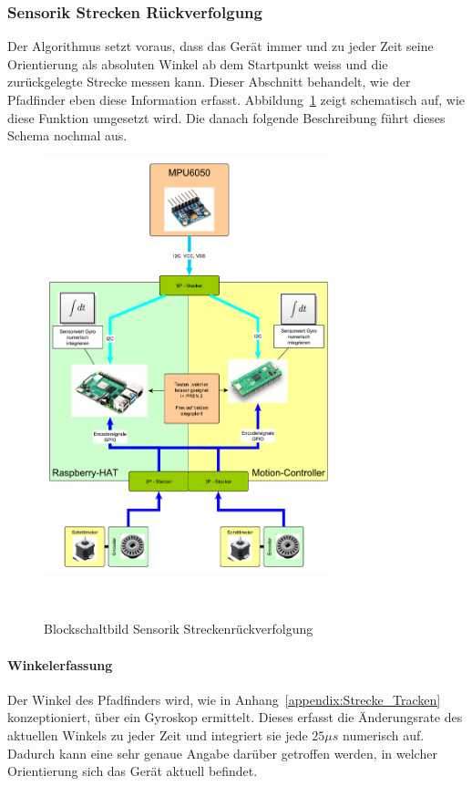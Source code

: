 \documentclass[main.tex]{subfiles} %
\begin{document}

\subsubsection{Sensorik Strecken Rückverfolgung}

Der Algorithmus setzt voraus, dass das Gerät immer und zu jeder Zeit seine
Orientierung als absoluten Winkel ab dem Startpunkt weiss und die zurückgelegte
Strecke messen kann. Dieser Abschnitt behandelt, wie der Pfadfinder eben diese
Information erfasst. Abbildung~\ref{fig:Blockschaltbild_StreckenTracken} zeigt
schematisch auf, wie diese Funktion umgesetzt wird. Die danach folgende
Beschreibung führt dieses Schema nochmal aus.

\begin{figure}[H]
    \centering
    \includegraphics[width=0.75\textwidth]{./fig_Strecke_Tracken/Topologie_MPU6050.pdf}
    \caption{Blockschaltbild Sensorik Streckenrückverfolgung}~\label{fig:Blockschaltbild_StreckenTracken}
\end{figure}

\paragraph{Winkelerfassung}
Der Winkel des Pfadfinders wird, wie in Anhang~\ref{appendix:Strecke_Tracken}
konzeptioniert, über ein Gyroskop ermittelt. Dieses erfasst die Änderungsrate
des aktuellen Winkels zu jeder Zeit und integriert sie jede $25\mu s$ numerisch
auf. Dadurch kann eine sehr genaue Angabe darüber getroffen werden, in welcher
Orientierung sich das Gerät aktuell befindet.
\end{document}
